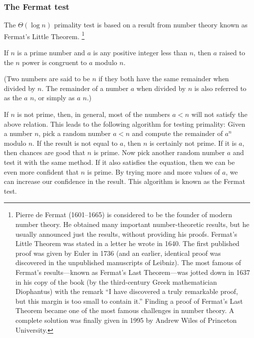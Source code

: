 \subsubsection*{The Fermat test}

The \( Θ(\log n) \) primality test is based on a result from number theory known as Fermat’s Little Theorem.%
\footnote{
	Pierre de Fermat (1601--1665) is considered to be the founder of modern number theory.
	He obtained many important number-theoretic results, but he usually announced just the results, without providing his proofs.
	Fermat’s Little Theorem was stated in a letter he wrote in 1640.
	The first published proof was given by Euler in 1736 (and an earlier, identical proof was discovered in the unpublished manuscripts of Leibniz).
	The most famous of Fermat’s results---known as Fermat’s Last Theorem---was jotted down in 1637 in his copy of the book  (by the third-century Greek mathematician Diophantus) with the remark “I have discovered a truly remarkable proof, but this margin is too small to contain it.”
	Finding a proof of Fermat’s Last Theorem became one of the most famous challenges in number theory.
	A complete solution was finally given in 1995 by Andrew Wiles of Princeton University.
}
\begin{theorem}
	If \( n \) is a prime number and \( a \) is any positive integer less than \( n \), then \( a \) raised to the \( n \) power is congruent to \( a \) modulo \( n \).
\end{theorem}
(Two numbers are said to be  \( n \) if they both have the same remainder when divided by \( n \).
The remainder of a number \( a \) when divided by \( n \) is also referred to as the  \( a \)  \( n \), or simply as \( a \)  \( n \).)

If \( n \) is not prime, then, in general, most of the numbers \( a < n \) will not satisfy the above relation.
This leads to the following algorithm for testing primality:
Given a number \( n \), pick a random number \( a < n \) and compute the remainder of \( a^n \) modulo \( n \).
If the result is not equal to \( a \), then \( n \) is certainly not prime.
If it is \( a \), then chances are good that \( n \) is prime.
Now pick another random number \( a \) and test it with the same method.
If it also satisfies the equation, then we can be even more confident that \( n \) is prime.
By trying more and more values of \( a \), we can increase our confidence in the result.
This algorithm is known as the Fermat test.

